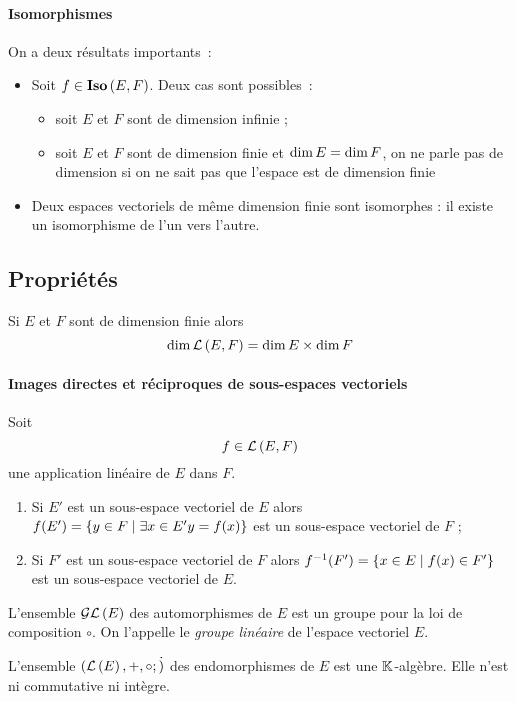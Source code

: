 \paragraph{Isomorphismes} 
On a deux résultats importants~: 
\begin{itemize} 
    \item Soit $f \in \mathbf{Iso}\left(E,F\right)$. Deux cas sont possibles~: 
    \begin{itemize} 
        \item soit $E$ et $F$ sont de dimension infinie ; 
        \item soit $E$ et $F$ sont de dimension finie et $\operatorname{dim}{E} = \operatorname{dim}{F}$, on
            ne parle pas de dimension si on ne sait pas que l'espace est de
            dimension finie
    \end{itemize} 
    \item Deux espaces vectoriels de même dimension finie sont isomorphes : il
        existe un isomorphisme de l'un vers l'autre.
\end{itemize}
\subsection{Propriétés}
\label{subsec-chap0:Prop} 
\begin{prop} 
    Si $E$ et $F$ sont de dimension finie alors
    \begin{equation}
        \operatorname{dim}\mathcal{L}\left(E,F\right)=\operatorname{dim}{E} \times \operatorname{dim}{F}
    \end{equation}
\end{prop}
\paragraph{Images directes et réciproques de sous-espaces vectoriels} 
\begin{prop}
    Soit \[f \in \mathcal{L}\left(E,F\right)\] une application linéaire de $E$ dans $F$.
    \begin{enumerate} 
        \item Si $E'$ est un sous-espace vectoriel de $E$ alors $f(E') =
        \left\{y \in F\mathrel{}\middle|\mathrel{}\exists x \in E' y=f(x)\right\}$ est un sous-espace vectoriel
            de $F$ ;
        \item Si $F'$ est un sous-espace vectoriel de $F$ alors $f^{-1}(F') =
            \left\{x \in E\mathrel{}\middle|\mathrel{}f(x) \in F'\right\}$ est un sous-espace vectoriel de $E$.
    \end{enumerate}
\end{prop}
\begin{prop} 
    L'ensemble $\mathcal{GL}\left(E\right)$ des automorphismes de $E$ est un groupe pour la loi de
    composition $\circ$. On l'appelle le \emph{groupe linéaire} de l'espace vectoriel $E$.  
\end{prop}
\begin{prop} 
    L'ensemble $(\mathcal{L}\left(E\right),+,\circ;\dot)$ des endomorphismes de $E$ est une
    $\mathbb{K}$-algèbre. Elle n'est ni commutative ni intègre.
\end{prop}
